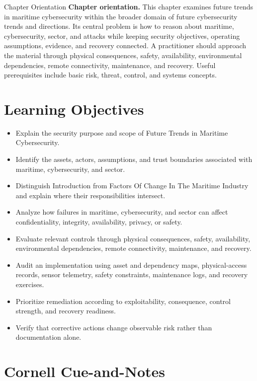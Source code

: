 \documentclass[11pt,letterpaper]{article}
\title{\CornellDocumentTitle}
\author{}
\date{}
\begin{document}
\maketitle
\begin{CornellOverviewBox}{Chapter Orientation}
\textbf{Chapter orientation.} This chapter examines future trends in maritime cybersecurity within the broader domain of future cybersecurity trends and directions. Its central problem is how to reason about maritime, cybersecurity, sector, and attacks while keeping security objectives, operating assumptions, evidence, and recovery connected. A practitioner should approach the material through physical consequences, safety, availability, environmental dependencies, remote connectivity, maintenance, and recovery. Useful prerequisites include basic risk, threat, control, and systems concepts.
\end{CornellOverviewBox}
\section*{Learning Objectives}
\begin{itemize}
\item Explain the security purpose and scope of Future Trends in Maritime Cybersecurity.
\item Identify the assets, actors, assumptions, and trust boundaries associated with maritime, cybersecurity, and sector.
\item Distinguish Introduction from Factors Of Change In The Maritime Industry and explain where their responsibilities intersect.
\item Analyze how failures in maritime, cybersecurity, and sector can affect confidentiality, integrity, availability, privacy, or safety.
\item Evaluate relevant controls through physical consequences, safety, availability, environmental dependencies, remote connectivity, maintenance, and recovery.
\item Audit an implementation using asset and dependency maps, physical-access records, sensor telemetry, safety constraints, maintenance logs, and recovery exercises.
\item Prioritize remediation according to exploitability, consequence, control strength, and recovery readiness.
\item Verify that corrective actions change observable risk rather than documentation alone.
\end{itemize}
\section*{Cornell Cue-and-Notes}
\end{document}
